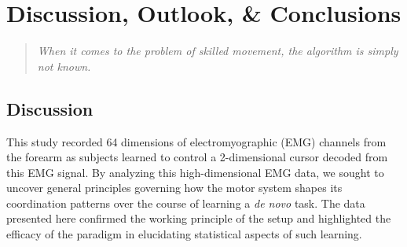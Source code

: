 \documentclass[../main.tex]{subfiles}
\begin{document}
\chapter{Discussion, Outlook, \& Conclusions}\label{chap:conclusion}


\begin{quote}
    \raggedright{\emph{When it comes to the problem of skilled movement, the algorithm is simply not known.}}\\ 
\end{quote}


\cleardoublepage%

\section{Discussion} %



This study recorded 64 dimensions of electromyographic (EMG) channels from the forearm as subjects learned to control a 2-dimensional cursor decoded from this EMG signal. By analyzing this high-dimensional EMG data, we sought to uncover general principles governing how the motor system shapes its coordination patterns over the course of learning a \textit{de novo} task. The data presented here confirmed the working principle of the setup and highlighted the efficacy of the paradigm in elucidating statistical aspects of such learning.
\end{document}

